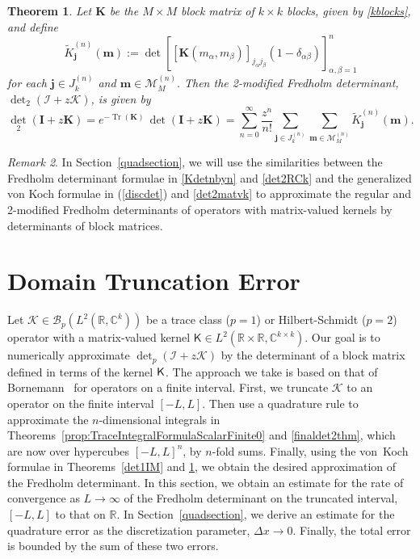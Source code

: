 \documentclass{birkjour}
\newtheorem{thm}{Theorem}[section]
\theoremstyle{definition}
\theoremstyle{remark}
\newtheorem{rem}[thm]{Remark}
\numberwithin{equation}{section}
\begin{document}
\begin{thm}\label{vonKoch2block}
    Let $\mathbf{K}$ be the $M \times M$ 
 block matrix of $k \times k$ blocks,
 given by \eqref{kblocks}, and define
 \begin{equation}
     \widetilde{K}^{(n)}_{\mathbf{j}}(\mathbf{m}) := \det \left[ [\mathbf{K}(m_{\alpha}, m_{\beta})]_{j_{\alpha} j_{\beta}} (1 - \delta_{\alpha \beta})\right]_{\alpha, \beta = 1}^n
 \end{equation}
for each $\mathbf{j} \in J^{(n)}_k$ and $\mathbf{m} \in \mathcal{M}^{(n)}_M.$
Then the 2-modified Fredholm determinant, $ {\det}_{2}(\mathcal{I} + z\mathcal{K})$, is given by
\begin{equation}\label{det2matvk}
 {\det}_{2}(\mathbf{I} + z\mathbf{K}) = 
 e^{-\operatorname{Tr}(\mathbf K)}\,  {\det}(\mathbf{I} + z\mathbf{K}) =
 \sum_{n=0}^{\infty} \frac{z^n}{n!} \sum_{\mathbf{j} \in J^{(n)}_k}  \sum_{\mathbf{m}\in \mathcal{M}^{(n)}_{M}} \widetilde{K}^{(n)}_{\mathbf{j}}(\mathbf{m}).
 \end{equation}
\end{thm}
\begin{rem}
In Section~\ref{quadsection}, we will use 
  the similarities between the Fredholm 
  determinant formulae in \eqref{Kdetnbyn} and \eqref{det2RCk}
  and the generalized von Koch formulae in (\ref{discdet}) and \eqref{det2matvk}
  to approximate the regular and 2-modified Fredholm determinants of operators with matrix-valued kernels  by determinants of block matrices.
\end{rem}

\section{Domain Truncation Error}\label{truncsection}

Let $\mathcal K \in \mathcal B_p(L^2(\mathbb R, \mathbb C^k))$ be a trace class ($p=1$)
or Hilbert-Schmidt ($p=2$) operator with a matrix-valued kernel $\textsf{K}\in L^2(
\mathbb R\times \mathbb R, \mathbb C^{k\times k})$. Our goal is to numerically
approximate ${\det}_p(\mathcal I + z \mathcal K)$ by the determinant of a 
block matrix defined in terms of the kernel $\textsf K$. The approach we take is
based on that of Bornemann~\cite{Bornemann} for operators on a finite interval.
First, we truncate $\mathcal K$ to an operator on the finite interval $[-L,L]$.
Then use a quadrature rule to approximate the $n$-dimensional 
integrals in Theorems~\ref{prop:TraceIntegralFormulaScalarFinite0} and \ref{finaldet2thm}, 
which are now over  hypercubes $[-L,L]^n$, by $n$-fold sums.
Finally, using the von~Koch formulae in Theorems~\ref{det1IM} and \ref{vonKoch2block},
we obtain the 
desired approximation of the Fredholm determinant.
In this section, we obtain an estimate for the rate of convergence as 
$L\to \infty$ of the 
Fredholm determinant on the truncated interval, $[-L,L]$ to that on $\mathbb R$.  In Section~\ref{quadsection}, we derive an estimate for the
quadrature error as the discretization parameter, $\Delta x\to 0$. Finally, the total
error is bounded by the sum of these two errors. 
\end{document}
